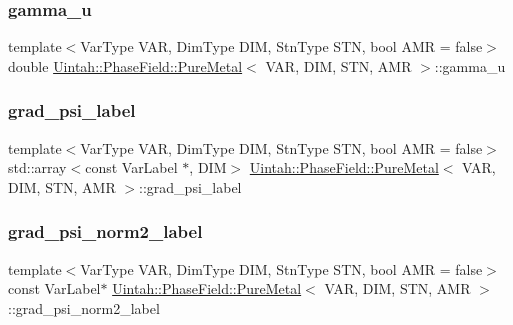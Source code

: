 \subsubsection{\texorpdfstring{gamma\+\_\+u}{gamma\_u}}
{\footnotesize\ttfamily template$<$Var\+Type V\+AR, Dim\+Type D\+IM, Stn\+Type S\+TN, bool A\+MR = false$>$ \\
double \hyperlink{classUintah_1_1PhaseField_1_1PureMetal}{Uintah\+::\+Phase\+Field\+::\+Pure\+Metal}$<$ V\+AR, D\+IM, S\+TN, A\+MR $>$\+::gamma\+\_\+u\hspace{0.3cm}{\ttfamily [protected]}}

\mbox{\label{classUintah_1_1PhaseField_1_1PureMetal_abac00bbaac3024d05c8ff5173dee9ed6}} 
\subsubsection{\texorpdfstring{grad\+\_\+psi\+\_\+label}{grad\_psi\_label}}
{\footnotesize\ttfamily template$<$Var\+Type V\+AR, Dim\+Type D\+IM, Stn\+Type S\+TN, bool A\+MR = false$>$ \\
std\+::array$<$const Var\+Label $\ast$, D\+IM$>$ \hyperlink{classUintah_1_1PhaseField_1_1PureMetal}{Uintah\+::\+Phase\+Field\+::\+Pure\+Metal}$<$ V\+AR, D\+IM, S\+TN, A\+MR $>$\+::grad\+\_\+psi\+\_\+label\hspace{0.3cm}{\ttfamily [protected]}}

\mbox{\label{classUintah_1_1PhaseField_1_1PureMetal_ae14f310fbd200ecd19c7179c6b272c9a}} 
\subsubsection{\texorpdfstring{grad\+\_\+psi\+\_\+norm2\+\_\+label}{grad\_psi\_norm2\_label}}
{\footnotesize\ttfamily template$<$Var\+Type V\+AR, Dim\+Type D\+IM, Stn\+Type S\+TN, bool A\+MR = false$>$ \\
const Var\+Label$\ast$ \hyperlink{classUintah_1_1PhaseField_1_1PureMetal}{Uintah\+::\+Phase\+Field\+::\+Pure\+Metal}$<$ V\+AR, D\+IM, S\+TN, A\+MR $>$\+::grad\+\_\+psi\+\_\+norm2\+\_\+label\hspace{0.3cm}{\ttfamily [protected]}}

